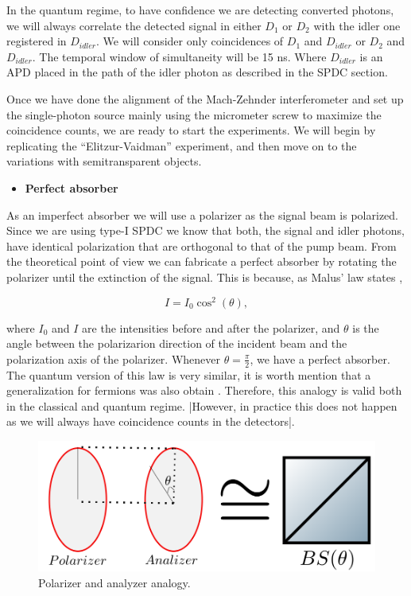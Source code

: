 \documentclass[12pt]{book}
\begin{document}
 In the quantum regime, to have confidence we are detecting converted photons, we will always correlate the detected signal in either $D_{1}$ or $D_{2}$ with the idler one registered in $D_{idler}$. We will consider only coincidences of $D_{1}$ and $D_{idler}$ or $D_{2}$ and $D_{idler}$. The temporal window of simultaneity will be 15 ns. Where $D_{idler}$ is an APD placed in the path of the idler photon as described in the SPDC section.




Once we have done the alignment of the Mach-Zehnder interferometer and set up the single-photon source mainly using the micrometer screw to maximize the coincidence counts, we are ready to start the experiments. We will begin by replicating the ``Elitzur-Vaidman'' experiment, and then move on to the variations with semitransparent objects.


\begin{itemize}
\item {\large \textbf{Perfect absorber}}
\end{itemize}
As an imperfect absorber we will use a polarizer as the signal beam is polarized. Since we are using type-I SPDC we know that both, the signal and idler photons, have identical polarization that are orthogonal to that of the pump beam. From the theoretical point of view we can fabricate a perfect absorber by rotating the polarizer until the extinction of the signal. This is because, as Malus' law states \cite{hecht},

\begin{equation}
I=I_{0} \cos^{2}(\theta),
\end{equation}

where $I_{0}$ and $I$ are the intensities before and after the polarizer, and $\theta$ is the angle between the polarizarion direction of the incident beam and the polarization axis of the polarizer. Whenever $\theta = \frac{\pi}{2}$, we have a perfect absorber. The quantum version of this law is very similar, it is worth mention that a generalization for fermions was also obtain \cite{malus}. Therefore, this analogy is valid both in the classical and quantum regime. |However, in practice this does not happen as we will always have coincidence counts in the detectors|.




\begin{figure}[t!]
\centering
\includegraphics[scale=0.3]{images/polarizeranalogy.png}
\caption{Polarizer and analyzer analogy.}
\label{BS and polarizer}
\end{figure}
\end{document}

